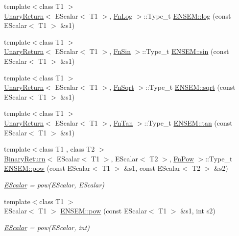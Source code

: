 \begin{DoxyCompactItemize}
\item 
{\footnotesize template$<$class T1 $>$ }\\\mbox{\hyperlink{structUnaryReturn}{Unary\+Return}}$<$ E\+Scalar$<$ T1 $>$, \mbox{\hyperlink{structFnLog}{Fn\+Log}} $>$\+::Type\+\_\+t \mbox{\hyperlink{group__escalar_gabe969a92b7a6a506a417bb17fdf68b4c}{E\+N\+S\+E\+M\+::log}} (const E\+Scalar$<$ T1 $>$ \&s1)
\item 
{\footnotesize template$<$class T1 $>$ }\\\mbox{\hyperlink{structUnaryReturn}{Unary\+Return}}$<$ E\+Scalar$<$ T1 $>$, \mbox{\hyperlink{structFnSin}{Fn\+Sin}} $>$\+::Type\+\_\+t \mbox{\hyperlink{group__escalar_ga373122acba11edfbe0eff82093788afe}{E\+N\+S\+E\+M\+::sin}} (const E\+Scalar$<$ T1 $>$ \&s1)
\item 
{\footnotesize template$<$class T1 $>$ }\\\mbox{\hyperlink{structUnaryReturn}{Unary\+Return}}$<$ E\+Scalar$<$ T1 $>$, \mbox{\hyperlink{structFnSqrt}{Fn\+Sqrt}} $>$\+::Type\+\_\+t \mbox{\hyperlink{group__escalar_ga4e0889a609d84d3ddac113e68bfccfa4}{E\+N\+S\+E\+M\+::sqrt}} (const E\+Scalar$<$ T1 $>$ \&s1)
\item 
{\footnotesize template$<$class T1 $>$ }\\\mbox{\hyperlink{structUnaryReturn}{Unary\+Return}}$<$ E\+Scalar$<$ T1 $>$, \mbox{\hyperlink{structFnTan}{Fn\+Tan}} $>$\+::Type\+\_\+t \mbox{\hyperlink{group__escalar_ga560632c018611046a7009dc56681b77d}{E\+N\+S\+E\+M\+::tan}} (const E\+Scalar$<$ T1 $>$ \&s1)
\item 
{\footnotesize template$<$class T1 , class T2 $>$ }\\\mbox{\hyperlink{structBinaryReturn}{Binary\+Return}}$<$ E\+Scalar$<$ T1 $>$, E\+Scalar$<$ T2 $>$, \mbox{\hyperlink{structFnPow}{Fn\+Pow}} $>$\+::Type\+\_\+t \mbox{\hyperlink{group__escalar_gaa3f8d5129f1ded089d42af89bd94827d}{E\+N\+S\+E\+M\+::pow}} (const E\+Scalar$<$ T1 $>$ \&s1, const E\+Scalar$<$ T2 $>$ \&s2)
\begin{DoxyCompactList}\small\item\em \mbox{\hyperlink{classENSEM_1_1EScalar}{E\+Scalar}} = pow(\+E\+Scalar, E\+Scalar) \end{DoxyCompactList}\item 
{\footnotesize template$<$class T1 $>$ }\\E\+Scalar$<$ T1 $>$ \mbox{\hyperlink{group__escalar_gaba7571beee718548316367ab8d623e70}{E\+N\+S\+E\+M\+::pow}} (const E\+Scalar$<$ T1 $>$ \&s1, int s2)
\begin{DoxyCompactList}\small\item\em \mbox{\hyperlink{classENSEM_1_1EScalar}{E\+Scalar}} = pow(\+E\+Scalar, int) \end{DoxyCompactList}\item 

\end{DoxyCompactItemize}
